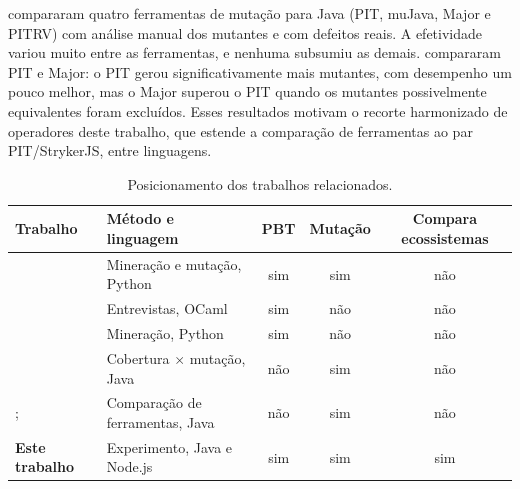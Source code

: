 \textbf{\citet{kintis2018tools}} compararam quatro ferramentas de mutação para Java (PIT, muJava, Major e PITRV) com análise manual dos mutantes e com defeitos reais. A efetividade variou muito entre as ferramentas, e nenhuma subsumiu as demais. \textbf{\citet{monteiro2022tools}} compararam PIT e Major: o PIT gerou significativamente mais mutantes, com desempenho um pouco melhor, mas o Major superou o PIT quando os mutantes possivelmente equivalentes foram excluídos. Esses resultados motivam o recorte harmonizado de operadores deste trabalho, que estende a comparação de ferramentas ao par PIT/StrykerJS, entre linguagens.

\begin{table}[!htbp]
\centering
\caption{Posicionamento dos trabalhos relacionados.}
\label{tab:relacionados}
\small
\begin{tabularx}{\textwidth}{@{}L{3.4cm} Y c c c@{}}
\toprule
Trabalho & Método e linguagem & PBT & Mutação & Compara ecossistemas \\
\midrule
\citet{ravi2025pbt} & Mineração e mutação, Python & sim & sim & não \\
\citet{goldstein2024pbt} & Entrevistas, OCaml & sim & não & não \\
\citet{corgozinho2023pbt} & Mineração, Python & sim & não & não \\
\citet{jain2023gap} & Cobertura $\times$ mutação, Java & não & sim & não \\
\citet{kintis2018tools}; \citet{monteiro2022tools} & Comparação de ferramentas, Java & não & sim & não \\
\textbf{Este trabalho} & Experimento, Java e Node.js & sim & sim & sim \\
\bottomrule
\end{tabularx}
\end{table}
